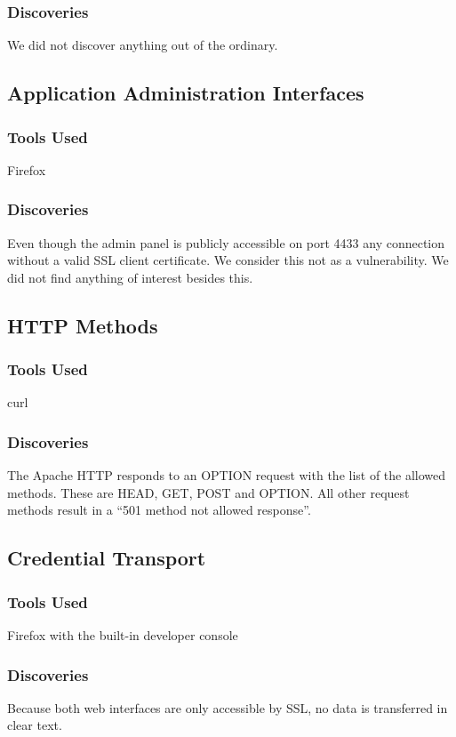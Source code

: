 \documentclass{article}
\begin{document}
\subsubsection*{Discoveries}
We did not discover anything out of the ordinary.

\subsection{Application Administration Interfaces}
\subsubsection*{Tools Used}
Firefox

\subsubsection*{Discoveries}
Even though the admin panel is publicly accessible on port 4433 any connection without a valid SSL client certificate. We consider this not as a vulnerability.\newline
We did not find anything of interest besides this.


\subsection{HTTP Methods}
\subsubsection*{Tools Used}
curl

\subsubsection*{Discoveries}
The Apache HTTP responds to an OPTION request with the list of the allowed methods. These are HEAD, GET, POST and OPTION. All other request methods result in a ``501 method not allowed response''.

\subsection{Credential Transport}
\subsubsection*{Tools Used}
Firefox with the built-in developer console

\subsubsection*{Discoveries}
Because both web interfaces are only accessible by SSL, no data is transferred in clear text.
\end{document}
